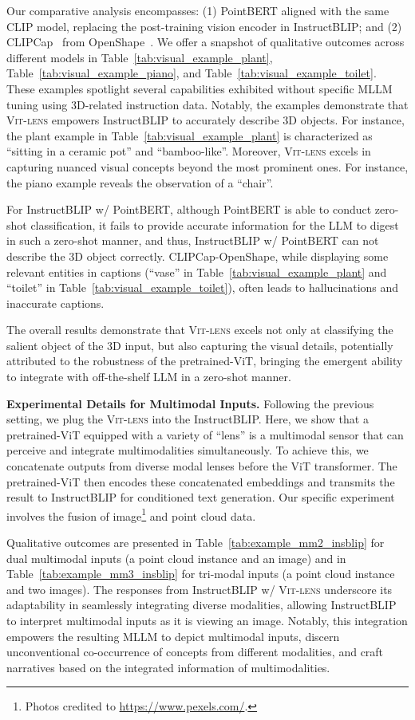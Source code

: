 \documentclass{article}
\newcommand{\ptvit}{pretrained-ViT\xspace}
\newcommand{\vit}{ViT\xspace}
\newcommand{\methodname}{{\scshape Vit-lens}\xspace}
\begin{document}
Our comparative analysis encompasses: (1) PointBERT aligned with the same CLIP model, replacing the post-training vision encoder in InstructBLIP; and (2) CLIPCap~\cite{mokady2021clipcap} from OpenShape~\cite{liu2023openshape}.
We offer a snapshot of qualitative outcomes across different models in Table~\ref{tab:visual_example_plant}, Table~\ref{tab:visual_example_piano}, and Table~\ref{tab:visual_example_toilet}. These examples spotlight several capabilities exhibited without specific MLLM tuning using 3D-related instruction data. Notably, the examples demonstrate that \methodname empowers InstructBLIP to accurately describe 3D objects. For instance, the plant example in Table~\ref{tab:visual_example_plant} is characterized as ``sitting in a ceramic pot'' and ``bamboo-like''. Moreover, \methodname excels in capturing nuanced visual concepts beyond the most prominent ones. For instance, the piano example reveals the observation of a ``chair''.

For InstructBLIP w/ PointBERT, although PointBERT is able to conduct zero-shot classification, it fails to provide accurate information for the LLM to digest in such a zero-shot manner, and thus, InstructBLIP w/ PointBERT can not describe the 3D object correctly. 
CLIPCap-OpenShape, while displaying some relevant entities in captions (``vase'' in Table~\ref{tab:visual_example_plant} and ``toilet'' in Table~\ref{tab:visual_example_toilet}), often leads to hallucinations and inaccurate captions.

The overall results demonstrate that \methodname excels not only at classifying the salient object of the 3D input, but also capturing the visual details, potentially attributed to the robustness of the \ptvit,  bringing the emergent ability to integrate with off-the-shelf LLM in a zero-shot manner.


\textbf{Experimental Details for Multimodal Inputs.} Following the previous setting, we plug the \methodname into the InstructBLIP. Here, we show that a \ptvit equipped with a variety of ``lens'' is a multimodal sensor that can perceive and integrate multimodalities simultaneously. To achieve this, we concatenate outputs from diverse modal lenses before the \vit transformer. The \ptvit then encodes these concatenated embeddings and transmits the result to InstructBLIP for conditioned text generation. Our specific experiment involves the fusion of image\footnote{Photos credited to \url{https://www.pexels.com/}.} and point cloud data. 

Qualitative outcomes are presented in Table~\ref{tab:example_mm2_insblip} for dual multimodal inputs (a point cloud instance and an image) and in Table~\ref{tab:example_mm3_insblip} for tri-modal inputs (a point cloud instance and two images). The responses from InstructBLIP w/ \methodname underscore its adaptability in seamlessly integrating diverse modalities, allowing InstructBLIP to interpret multimodal inputs as it is viewing an image. Notably, this integration empowers the resulting MLLM to depict multimodal inputs, discern unconventional co-occurrence of concepts from different modalities, and craft narratives based on the integrated information of multimodalities.
\end{document}
